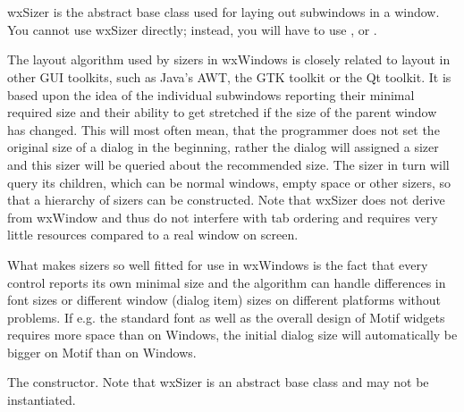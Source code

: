 \section{}\label{wxsizer}

wxSizer is the abstract base class used for laying out subwindows in a window. You
cannot use wxSizer directly; instead, you will have to use , 
 or .

The layout algorithm used by sizers in wxWindows is closely related to layout
in other GUI toolkits, such as Java's AWT, the GTK toolkit or the Qt toolkit. It is
based upon the idea of the individual subwindows reporting their minimal required
size and their ability to get stretched if the size of the parent window has changed.
This will most often mean, that the programmer does not set the original size of
a dialog in the beginning, rather the dialog will assigned a sizer and this sizer
will be queried about the recommended size. The sizer in turn will query its
children, which can be normal windows, empty space or other sizers, so that
a hierarchy of sizers can be constructed. Note that wxSizer does not derive from wxWindow
and thus do not interfere with tab ordering and requires very little resources compared
to a real window on screen.

What makes sizers so well fitted for use in wxWindows is the fact that every control
reports its own minimal size and the algorithm can handle differences in font sizes
or different window (dialog item) sizes on different platforms without problems. If e.g.
the standard font as well as the overall design of Motif widgets requires more space than
on Windows, the initial dialog size will automatically be bigger on Motif than on Windows.





\label{wxsizerwxsizer}


The constructor. Note that wxSizer is an abstract base class and may not
be instantiated.

